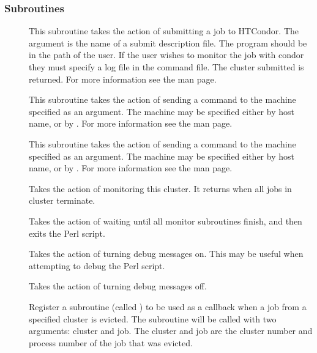 \subsubsection{Subroutines}
\begin{description}
	\item []
	This subroutine takes the action of submitting a job to HTCondor.
	The argument is the name of a submit description file.
	The  program should be in the
	path of the user.  If the user wishes to monitor the job with condor
	they must specify a log file in the command file.  The cluster
	submitted is returned. For more information
	see the  man page.
	
	\item []
	This subroutine takes the action of sending a
	 command to the machine specified as an argument.
	The machine may be specified
	either by host name, or by .  For more information
	see the  man page.

	\item []
	This subroutine takes the action of sending a
	 command to the machine specified as an argument.
	The machine may be specified either
 	by host name, or by .  For more information see
	the  man page.

	\item []
	Takes the action of monitoring this cluster.
	It returns when all jobs in cluster terminate.
	
	\item [] 
	Takes the action of waiting until all monitor subroutines finish,
	and then exits the Perl script.

	\item []
	Takes the action of turning debug messages on.
	This may be useful when attempting to debug the Perl script.

	\item []
	Takes the action of turning debug messages off.

	\item []
	Register a subroutine (called )
	to be used as a callback when a job from
	a specified cluster is evicted.  The subroutine will be
	called with two arguments: cluster and job. The cluster
	and job are the cluster number and process number of the job that
	was evicted.
	

\end{description}
